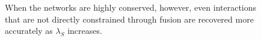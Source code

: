 \documentclass[11pt]{article}
\begin{document}
\begin{figure}
\begin{center}
{  When the networks are highly conserved, however, even interactions that are not directly constrained through fusion are recovered more accurately as $\lambda_S$ increases.}
\end{center}
\end{figure}
\pagebreak

\end{document}

